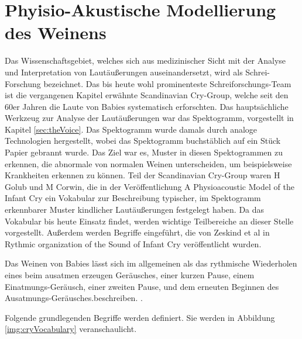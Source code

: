 \section{Phyisio-Akustische Modellierung des Weinens}
\label{sec:acousticModel}

Das Wissenschaftsgebiet, welches sich aus medizinischer Sicht mit der Analyse und Interpretation von Lautäußerungen auseinandersetzt, wird als \grqq Schrei-Forschung\glqq{} bezeichnet. Das bis heute wohl prominenteste Schreiforschungs-Team ist die vergangenen Kapitel erwähnte \glqq Scandinavian Cry-Group\grqq \cite{cryGroup}, welche seit den 60er Jahren die Laute von Babies systematisch erforschten. Das hauptsächliche Werkzeug zur Analyse der Lautäußerungen war das Spektogramm, vorgestellt in Kapitel \ref{sec:theVoice}. Das Spektogramm wurde damals durch analoge Technologien hergestellt, wobei das Spektogramm buchstäblich auf ein Stück Papier gebrannt wurde.  Das Ziel war es, Muster  in diesen Spektogrammen zu erkennen, die abnormale von normalen Weinen unterscheiden, um beispielsweise Krankheiten erkennen zu können. \cite[S. 142]{signal} Teil der Scandinavian Cry-Group waren H Golub und M Corwin, die in der Veröffentlichung \glqq A Physioacoustic Model of the Infant Cry \grqq{} \cite{cryModel} ein Vokabular zur Beschreibung typischer, im Spektogramm erkennbarer Muster kindlicher Lautäußerungen festgelegt haben. Da das Vokabular bis heute Einsatz findet, werden wichtige Teilbereiche an dieser Stelle vorgestellt. Außerdem werden Begriffe eingeführt, die von Zeskind et al in \glqq Rythmic organization of the Sound of Infant Cry \grqq{} veröffentlicht wurden.\cite{rythmic}

Das Weinen von Babies lässt sich im allgemeinen als das \glqq rythmische Wiederholen eines beim ausatmen erzeugen Geräusches, einer kurzen Pause, einem Einatmungs-Geräusch, einer zweiten Pause, und dem erneuten Beginnen des Ausatmungs-Geräusches.\grqq beschreiben. \cite{wolff}.

Folgende grundlegenden Begriffe werden definiert. Sie werden in Abbildung \ref{img:cryVocabulary} veranschaulicht.

